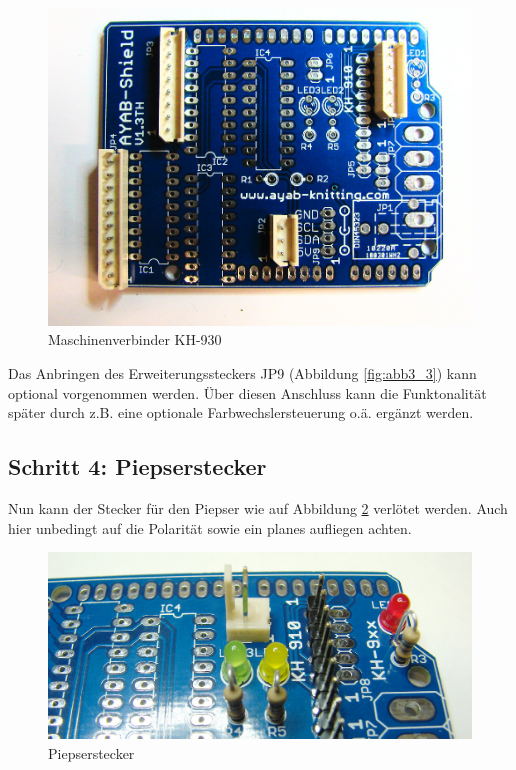 \documentclass[fleqn,10pt]{SelfArx} %
\begin{document}
\begin{figure}[tbhp]\centering
\includegraphics[width=\linewidth]{abb3_4}
\caption{Maschinenverbinder KH-930}
\label{fig:abb3_4}
\end{figure}

Das Anbringen des Erweiterungssteckers JP9 (Abbildung \ref{fig:abb3_3}) kann optional vorgenommen werden. Über diesen Anschluss kann die Funktonalität später durch z.B. eine optionale Farbwechslersteuerung o.ä. ergänzt werden. \par

\FloatBarrier

 \subsection*{Schritt 4: Piepserstecker}

Nun kann der Stecker für den Piepser wie auf Abbildung \ref{fig:abb4_1} verlötet werden. Auch hier unbedingt auf die Polarität sowie ein planes aufliegen achten.

\begin{figure}[tbhp]\centering
\includegraphics[width=\linewidth]{abb4_1}
\caption{Piepserstecker}
\label{fig:abb4_1}
\end{figure}
\end{document}

